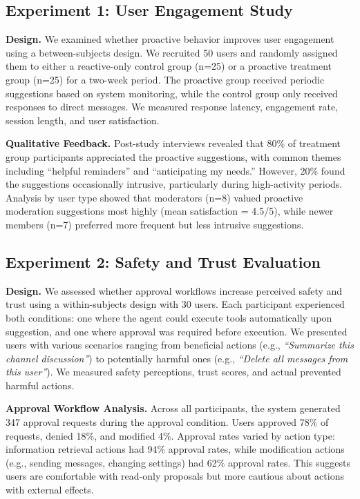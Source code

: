 \documentclass[letterpaper,10pt]{article}
\begin{document}
\subsection{Experiment 1: User Engagement Study}
\label{subsec:exp1}

\textbf{Design.} We examined whether proactive behavior improves user engagement using a between-subjects design. We recruited 50 users and randomly assigned them to either a reactive-only control group (n=25) or a proactive treatment group (n=25) for a two-week period. The proactive group received periodic suggestions based on system monitoring, while the control group only received responses to direct messages. We measured response latency, engagement rate, session length, and user satisfaction.

\textbf{Qualitative Feedback.} Post-study interviews revealed that 80\% of treatment group participants appreciated the proactive suggestions, with common themes including ``helpful reminders'' and ``anticipating my needs.'' However, 20\% found the suggestions occasionally intrusive, particularly during high-activity periods. Analysis by user type showed that moderators (n=8) valued proactive moderation suggestions most highly (mean satisfaction = 4.5/5), while newer members (n=7) preferred more frequent but less intrusive suggestions.

\subsection{Experiment 2: Safety and Trust Evaluation}
\label{subsec:exp2}

\textbf{Design.} We assessed whether approval workflows increase perceived safety and trust using a within-subjects design with 30 users. Each participant experienced both conditions: one where the agent could execute tools automatically upon suggestion, and one where approval was required before execution. We presented users with various scenarios ranging from beneficial actions (e.g., \textit{``Summarize this channel discussion''}) to potentially harmful ones (e.g., \textit{``Delete all messages from this user''}). We measured safety perceptions, trust scores, and actual prevented harmful actions.

\textbf{Approval Workflow Analysis.} Across all participants, the system generated 347 approval requests during the approval condition. Users approved 78\% of requests, denied 18\%, and modified 4\%. Approval rates varied by action type: information retrieval actions had 94\% approval rates, while modification actions (e.g., sending messages, changing settings) had 62\% approval rates. This suggests users are comfortable with read-only proposals but more cautious about actions with external effects.
\end{document}
